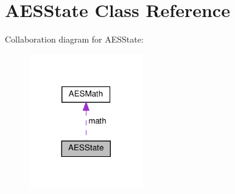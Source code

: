 \hypertarget{classAESState}{}\section{A\+E\+S\+State Class Reference}
\label{classAESState}


Collaboration diagram for A\+E\+S\+State\+:
\nopagebreak
\begin{figure}[H]
\begin{center}
\leavevmode
\includegraphics[width=140pt]{classAESState__coll__graph}
\end{center}
\end{figure}
